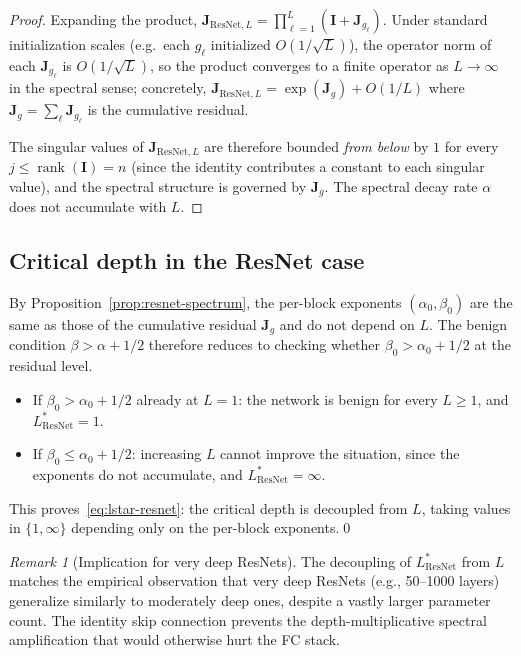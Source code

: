 \documentclass[12pt]{amsart}
\theoremstyle{definition}
\theoremstyle{remark}
\newtheorem{remark}[theorem]{Remark}
\DeclareMathOperator{\rank}{rank}
\newcommand{\bJ}{\mathbf{J}}
\newcommand{\bI}{\mathbf{I}}
\begin{document}
\begin{proof}
Expanding the product,
$\bJ_{\mathrm{ResNet}, L} = \prod_{\ell=1}^{L} (\bI + \bJ_{g_{\ell}})$.
Under standard initialization scales (e.g.\ each $g_{\ell}$ initialized
$O(1/\sqrt{L})$), the operator norm of each $\bJ_{g_{\ell}}$ is
$O(1/\sqrt{L})$, so the product converges to a finite operator as
$L \to \infty$ in the spectral sense; concretely,
$\bJ_{\mathrm{ResNet}, L} = \exp(\bJ_{g}) + O(1/L)$ where
$\bJ_{g} = \sum_{\ell} \bJ_{g_{\ell}}$ is the cumulative residual.

The singular values of $\bJ_{\mathrm{ResNet}, L}$ are therefore bounded
\emph{from below} by $1$ for every $j \leq \rank(\bI) = n$ (since the
identity contributes a constant to each singular value), and the
spectral structure is governed by $\bJ_{g}$. The spectral decay rate
$\alpha$ does not accumulate with $L$.
\end{proof}

\subsection{Critical depth in the ResNet case}

By Proposition~\ref{prop:resnet-spectrum}, the per-block exponents
$(\alpha_{0}, \beta_{0})$ are the same as those of the cumulative residual
$\bJ_{g}$ and do not depend on $L$. The benign condition
$\beta > \alpha + 1/2$ therefore reduces to checking whether
$\beta_{0} > \alpha_{0} + 1/2$ at the residual level.

\begin{itemize}
\item If $\beta_{0} > \alpha_{0} + 1/2$ already at $L = 1$: the network is
  benign for every $L \geq 1$, and $L^{*}_{\mathrm{ResNet}} = 1$.
\item If $\beta_{0} \leq \alpha_{0} + 1/2$: increasing $L$ cannot improve
  the situation, since the exponents do not accumulate, and
  $L^{*}_{\mathrm{ResNet}} = \infty$.
\end{itemize}

This proves~\eqref{eq:lstar-resnet}: the critical depth is decoupled from
$L$, taking values in $\{1, \infty\}$ depending only on the per-block
exponents.\qed

\begin{remark}[Implication for very deep ResNets]\label{rem:resnet-deep}
The decoupling of $L^{*}_{\mathrm{ResNet}}$ from $L$ matches the empirical
observation that very deep ResNets (e.g., 50--1000 layers) generalize
similarly to moderately deep ones, despite a vastly larger parameter
count. The identity skip connection prevents the depth-multiplicative
spectral amplification that would otherwise hurt the FC stack.
\end{remark}
\end{document}
